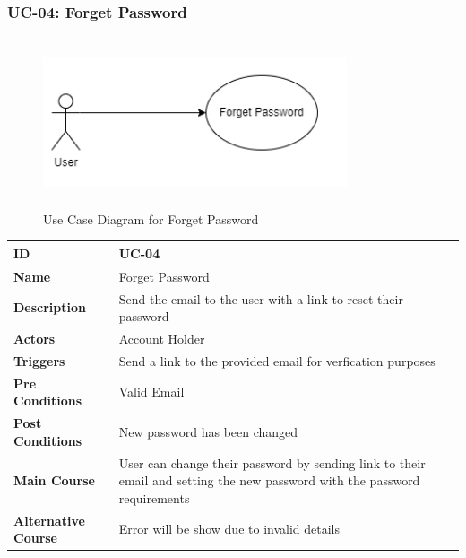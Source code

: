     \subsubsection{UC-04: Forget Password}
    \begin{figure}[H]
        \includegraphics[height=5cm, width=0.8\textwidth]{./diagrams/Use Case/u4.png}
        \centering 
        \caption{Use Case Diagram for Forget Password}
        \label{fig: Usecase1}
        \end{figure}
        
    \begin{center}
        \begin{tabularx}{\textwidth}{|l|X|}
            \hline
            \textbf{ID} & UC-04 \\
            \hline
            \textbf{Name} & Forget Password \\
            \hline
            \textbf{Description} & Send the email to the user with a link to reset their password \\
            \hline
            \textbf{Actors} & Account Holder \\
            \hline
           \textbf{Triggers} & Send a link to the provided email for verfication purposes \\
            \hline
            \textbf{Pre Conditions} & Valid Email \\
            \hline
            \textbf{Post Conditions} & New password has been changed \\
            \hline
            \textbf{Main Course} & User can change their password by sending link to their email and setting the new password with the password requirements \\
            \hline
            \textbf{Alternative Course} & Error will be show due to invalid details \\
            \hline
            
        \end{tabularx}
    \end{center}
    \newpage
    

